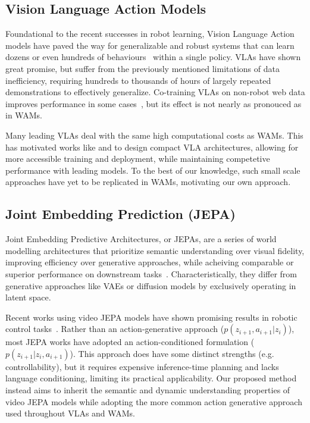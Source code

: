 \subsection{Vision Language Action Models}
Foundational to the recent successes in robot learning, Vision Language Action models have paved the way for generalizable and robust systems that can learn dozens or even hundreds of behaviours~\cite{pi0.5, GrootN1, geminirobotics, Octo} within a single policy. VLAs have shown great promise, but suffer from the previously mentioned limitations of data inefficiency, requiring hundreds to thousands of hours of largely repeated demonstrations to effectively generalize\cite{pi0.5, geminirobotics}. Co-training VLAs on non-robot web data improves performance in some cases~\cite{pi0.5}, but its effect is not nearly as pronouced as in WAMs.

Many leading VLAs deal with the same high computational costs as WAMs. This has motivated works like \citet{SmolVLA} and \citet{TinyVLA} to design compact VLA architectures, allowing for more accessible training and deployment, while maintaining competetive performance with leading models. To the best of our knowledge, such small scale approaches have yet to be replicated in WAMs, motivating our own approach. 


\subsection{Joint Embedding Prediction (JEPA)}
Joint Embedding Predictive Architectures, or JEPAs, are a series of world modelling architectures that prioritize semantic understanding over visual fidelity, improving efficiency over generative approaches, while acheiving comparable or superior performance on downstream tasks~\cite{vjepa2, vjepa2_1, IJEPA}. Characteristically, they differ from generative approaches like VAEs or diffusion models by exclusively operating in latent space. 

Recent works using video JEPA models have shown promising results in robotic control tasks~\cite{vjepa2, vjepa2_1, LeWorldModel}. Rather than an action-generative approach ($p(z_{i+1}, a_{i+1}| z_i)$), most JEPA works have adopted an action-conditioned formulation ($p(z_{i+1} | z_i, a_{i+1})$). This approach does have some distinct strengths (e.g. controllability), but it requires expensive inference-time planning and lacks language conditioning, limiting its practical applicability. Our proposed method instead aims to inherit the semantic and dynamic understanding properties of video JEPA models while adopting the more common action generative approach used throughout VLAs and WAMs.

